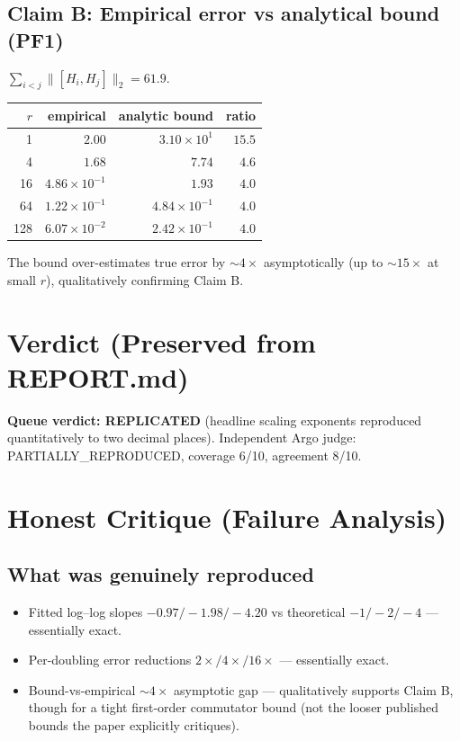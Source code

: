 \documentclass[11pt]{article}
\begin{document}
\subsection*{Claim B: Empirical error vs analytical bound (PF1)}
$\sum_{i<j}\|[H_i,H_j]\|_2=61.9$.
\begin{center}
\begin{tabular}{rrrr}
\toprule
$r$ & empirical & analytic bound & ratio \\
\midrule
1   & $2.00$      & $3.10\!\times\!10^{1}$ & $15.5$ \\
4   & $1.68$      & $7.74$                 & $4.6$  \\
16  & $4.86\!\times\!10^{-1}$ & $1.93$    & $4.0$  \\
64  & $1.22\!\times\!10^{-1}$ & $4.84\!\times\!10^{-1}$ & $4.0$ \\
128 & $6.07\!\times\!10^{-2}$ & $2.42\!\times\!10^{-1}$ & $4.0$ \\
\bottomrule
\end{tabular}
\end{center}
The bound over-estimates true error by ${\sim}4\times$ asymptotically
(up to ${\sim}15\times$ at small $r$), qualitatively confirming Claim B.

\section{Verdict (Preserved from REPORT.md)}
\textbf{Queue verdict: REPLICATED} (headline scaling exponents reproduced
quantitatively to two decimal places). Independent Argo judge:
PARTIALLY\_REPRODUCED, coverage 6/10, agreement 8/10.

\section{Honest Critique (Failure Analysis)}

\subsection*{What was genuinely reproduced}
\begin{itemize}
  \item Fitted log--log slopes $-0.97/-1.98/-4.20$ vs theoretical
  $-1/-2/-4$ --- essentially exact.
  \item Per-doubling error reductions $2\times/4\times/16\times$ --- essentially exact.
  \item Bound-vs-empirical ${\sim}4\times$ asymptotic gap --- qualitatively
  supports Claim B, though for a tight first-order commutator bound (not the
  looser published bounds the paper explicitly critiques).
\end{itemize}
\end{document}
